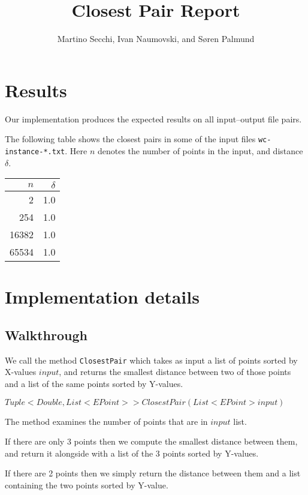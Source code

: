 \documentclass{tufte-handout}
\title{Closest Pair Report}
\author{Martino Secchi, Ivan Naumovski, and Søren Palmund}
\begin{document}
\maketitle

  \section{Results}

  Our implementation produces the expected results on all input--output file pairs.

  The following table shows the closest pairs in some of the input files {\tt wc-instance-*.txt}.
  Here $n$ denotes the number of points in the input,
  and distance $\delta$.

  \bigskip\noindent
  \begin{tabular}{rr}\toprule
    $n$ & $\delta$ \\\midrule
    2 & 1.0 \\
    254 & 1.0 \\
    16382 & 1.0 \\
    65534 & 1.0 \\\bottomrule
  \end{tabular}


  \section{Implementation details}
    
  \subsection{Walkthrough}
  
  We call the method \verb+ClosestPair+ which takes as input a list of points sorted by X-values $input$, and returns the smallest distance between two of those points and a list of the same points sorted by Y-values. \newline

  $Tuple<Double, List<EPoint> > ClosestPair( List<EPoint> input )$
  
  The method examines the number of points that are in $input$ list.\newline

  If there are only 3 points then we compute the smallest distance between them, and return it alongside with a list of the 3 points sorted by Y-values.\newline
  
  If there are 2 points then we simply return the distance between them and a list containing the two points sorted by Y-value.\newline
  
\end{document}

